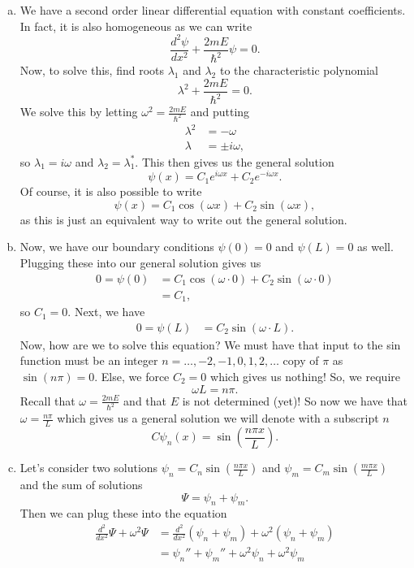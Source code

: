 \documentclass[12pt]{article} %
\begin{document}
\begin{solution}
\begin{enumerate}[(a)]
    \item We have a second order linear differential equation with constant coefficients. In fact, it is also homogeneous as we can write 
\[
\frac{d^2\psi}{dx^2}+\frac{2mE}{\hbar^2}\psi =0.
\]
Now, to solve this, find roots $\lambda_1$ and $\lambda_2$ to the characteristic polynomial
\[
\lambda^2+\frac{2mE}{\hbar^2}=0.
\]
We solve this by letting $\omega^2 = \frac{2mE}{\hbar^2}$ and putting
\begin{align*}
    \lambda^2&=-\omega\\
    \lambda&=\pm i \omega,
\end{align*}
so $\lambda_1=i\omega$ and $\lambda_2=\lambda_1^*$. This then gives us the general solution
\[
\psi(x)=C_1 e^{i\omega x}+C_2 e^{-i\omega x}.
\]
Of course, it is also possible to write 
\[
\psi(x)=C_1\cos(\omega x)+C_2\sin(\omega x),
\]
as this is just an equivalent way to write out the general solution. 
\item Now, we have our boundary conditions $\psi(0)=0$ and $\psi(L)=0$ as well.  Plugging these into our general solution gives us
\begin{align*}
    0=\psi(0)&=C_1 \cos(\omega \cdot 0)+C_2 \sin(\omega \cdot 0)\\
    &= C_1,
\end{align*}
so $C_1=0$.  Next, we have
\begin{align*}
    0=\psi(L)&=C_2\sin(\omega \cdot L).
\end{align*}
Now, how are we to solve this equation? We must have that input to the sin function must be an integer $n=\dots,-2,-1,0,1,2,\dots$ copy of $\pi$ as $\sin(n\pi)=0$. Else, we force $C_2=0$ which gives us nothing!  So, we require
\[
\omega L = n\pi.
\]
Recall that $\omega = \frac{2mE}{\hbar^2}$ and that $E$ is not determined (yet)! So now we have that $\omega = \frac{n\pi}{L}$ which gives us a general solution we will denote with a subscript $n$
\[
C\psi_n(x)=\sin\left(\frac{n\pi x}{L}\right).
\]
\item Let's consider two solutions $\psi_n=C_n\sin\left(\frac{n\pi x}{L}\right)$ and $\psi_m=C_m\sin\left(\frac{m\pi x}{L}\right)$ and the sum of solutions
\[
\Psi=\psi_n + \psi_m.
\]
Then we can plug these into the equation
\begin{align*}
    \frac{d^2}{dx^2}\Psi + \omega^2 \Psi&=\frac{d^2}{dx^2}(\psi_n + \psi_m)+\omega^2(\psi_n+\psi_m)\\ 
    &= \psi_n'' + \psi_m''  + \omega^2 \psi_n + \omega^2 \psi_m\\

\end{align*}
\end{enumerate}
\end{solution}
\end{document}
